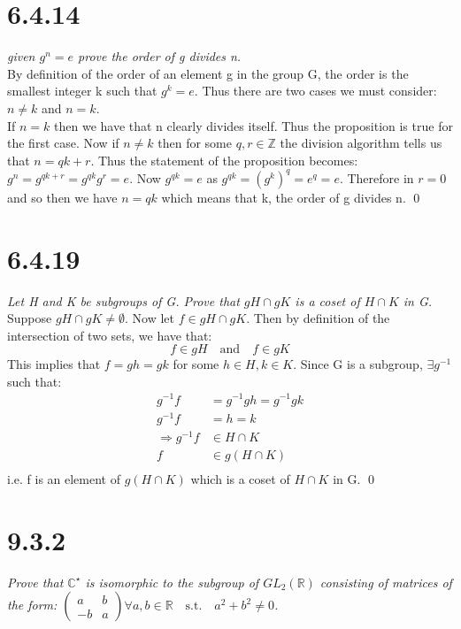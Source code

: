 \documentclass[a4paper, 11pt]{article}
\begin{document}
\section*{6.4.14}
\textit{given $g^n = e$ prove the order of g divides n.} \\

\noindent By definition of the order of an element g in the group G, the order is the smallest integer k such that $g^k = e$. Thus there are two cases we must consider: $n\neq k$ and $n = k$. \\

\noindent If $n=k$ then we have that n clearly divides itself. Thus the proposition is true for the first case. Now if $n \neq k$ then for some $q,r \in \mathbb{Z}$ the division algorithm tells us that $n = qk + r$. Thus the statement of the proposition becomes: $g^n = g^{qk+r} = g^{qk}g^r = e$. Now $g^{qk}=e$ as $g^{qk} = (g^{k})^q = e^q = e$. Therefore in $r = 0$ and so then we have $n = qk$ which means that k, the order of g divides n. \qed


\section*{6.4.19} 
\textit{Let H and K be subgroups of G. Prove that $gH \cap gK$ is a coset of $H \cap K$ in G.}\\ 

\noindent Suppose $gH \cap gK \neq \emptyset$. Now let $f \in gH \cap gK$. Then by definition of the intersection of two sets, we have that:
	\begin{equation*}
		f \in gH \quad \text{and} \quad f \in gK 
	\end{equation*}
\noindent This implies that $f = gh = gk$ for some $h \in H, k \in K$. Since G is a subgroup, $\exists g^{-1}$ such that: 
	\begin{align*}
		g^{-1}f &= g^{-1}gh = g^{-1}gk \\ 
		g^{-1}f &= h = k \\ 
		\Rightarrow g^{-1}f &\in H \cap K \\ 
		f &\in g(H \cap K) \\ 
	\end{align*}
i.e. f is an element of $g(H \cap K)$ which is a coset of $H \cap K$ in G. \qed


\section*{9.3.2} 
\textit{Prove that $\mathbb{C}^\star$ is isomorphic to the subgroup of $GL_2(\mathbb{R})$ consisting of matrices of the form: $\begin{pmatrix}
		a & b \\ 
		-b & a 
	\end{pmatrix} \forall a,b \in \mathbb{R} \quad  \text{s.t.} \quad a^2 +b^2 \neq 0$. }\\
\end{document}
